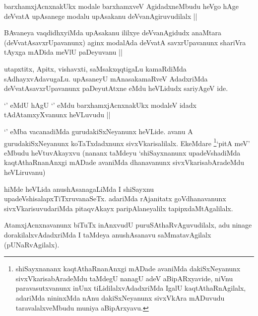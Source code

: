 
\begin{artha}
barxhamxjAcnxnakUkx modale barxhamxveV AgidadxneMbudu heVgo hAge deVvatA upAsanege modalu upAsakanu deVvanAgiruvudilalx || 
\end{artha}


\begin{artha}
BAvaneya vaqdidhxyiMda upAsakanu ililxye deVvanAgidudx anaMtara (deVvatAsavxrUpavanunx) aginx modalAda deVvatA savxrUpavanunx shariVra tAyxga mADida meVlU paDeyuvanu ||
\end{artha}

\begin{artha}
utapxtitx, Apitx, vishavxti, saMsakxqqtigaLu kamaRdiMda sAdhayxvAdavugaLu. upAsaneyU mAnasakamaRveV AdadxriMda deVvatAsavxrUpavanunx paDeyutAtxne eMdu heVLidudx sariyAgeV ide.
\end{artha}

\begin{artha}
`\stext' eMdU hAgU `\stext' eMdu barxhamxjAcnxnakUkx modaleV idadx tAdAtamxyXvanunx heVLuvudu ||
\end{artha}


\begin{artha}
`\stext' eMba vacanadiMda gurudakiSxNeyanunx heVLide. avanu A gurudakiSxNeyanunx koTaTxdadxnunx sivxVkarisalilalx. EkeMdare \footnote{shiSayxnananx kaqtAthaRnanAnxgi mADade avaniMda dakiSxNeyanunx sivxVkarisabAradeMdu taMdegU nanagU adeV aBipARxyavide, niVnu paravasutxvanunx inUnx tiLidilalxvAdadxriMda IgalU kaqtAthaRnAgilalx, adariMda nininxMda nAnu dakiSxNeyanunx sivxVkAra mADuvudu taravalalxveMbudu muniya aBipArxyavu.}`pitA meV' eMbudu heVtuvAkayxvu (nananx taMdeyu `shiSayxnanunx upadeVshadiMda kaqtAthaRnanAnxgi mADade avaniMda dhanavanunx sivxVkarisabAradeMdu heVLiruvanu)
\end{artha}


\begin{artha}
hiMde heVLida anushAsanagaLiMda I shiSayxnu upadeVshisalapxTiTxruvanaSeTx. adariMda rAjanitatx goVdhanavanunx sivxVkarisuvudariMda pitaqvAkayx paripAlaneyalilx tapipxdaMtAgalilalx.
\end{artha}

\begin{artha}
AtamxjAcnxnavanunx biTuTx inAnxvudU puruSAthaRvAguvudilalx, adu ninage dorakilalxvAdadxriMda I taMdeya anushAsanavu saMmatavAgilalx (pUNaRvAgilalx).
\end{artha}


